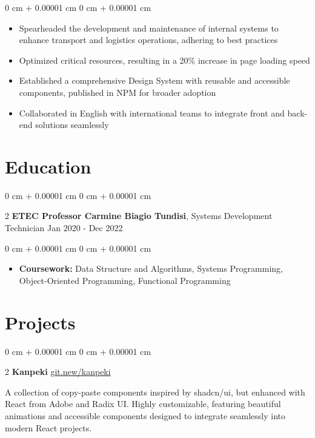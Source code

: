 \documentclass[10pt, letterpaper]{article}
\newenvironment{highlights}{ \begin{itemize}[ topsep=0.10 cm, parsep=0.10 cm, partopsep=0pt,
itemsep=0pt, leftmargin=0 cm + 10pt ] }{ \end{itemize} } %
\newenvironment{onecolentry}{ \begin{adjustwidth}{ 0 cm + 0.00001 cm }{ 0 cm + 0.00001 cm }
}{ \end{adjustwidth} } %
\newenvironment{twocolentry}[2][]{ \onecolentry \def\secondColumn{#2} \setcolumnwidth{\fill, 4.5 cm}
\begin{paracol}{2} }{ \switchcolumn \raggedleft \secondColumn \end{paracol}
\endonecolentry } %
\begin{document}
	\vspace{0.10 cm}
	\begin{onecolentry}
		\begin{highlights}
			\item Spearheaded the development and maintenance of internal systems to enhance transport and logistics operations, adhering to best practices
			\item Optimized critical resources, resulting in a 20\% increase in page loading speed
			\item Established a comprehensive Design System with reusable and accessible components, published in NPM for broader adoption
			\item Collaborated in English with international teams to integrate front and back-end solutions seamlessly
		\end{highlights}
	\end{onecolentry}
	
	\section{Education}
	
	\begin{twocolentry}
		{ Jan 2020 - Dec 2022 } \textbf{ETEC Professor Carmine Biagio Tundisi}, Systems
		Development Technician
	\end{twocolentry}
	
	\vspace{0.10 cm}
	\begin{onecolentry}
		\begin{highlights}
			\item \textbf{Coursework:} Data Structure and Algorithms, Systems Programming,
			Object-Oriented Programming, Functional Programming
		\end{highlights}
	\end{onecolentry}
	
	\section{Projects}
	
	\begin{twocolentry}
		{\href{https://git.new/kanpeki}{git.new/kanpeki}} \textbf{Kanpeki}
	\end{twocolentry}
	
	\vspace{0.10cm}
	A collection of copy-paste components inspired by shadcn/ui, but enhanced with
	React from Adobe and Radix UI. Highly customizable, featuring beautiful
	animations and accessible components designed to integrate seamlessly into
	modern React projects.
	
\end{document}

